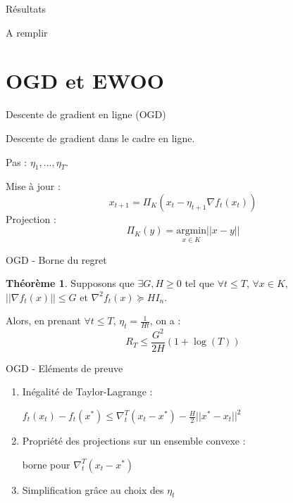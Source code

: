 \documentclass[aspectratio=1610,17pt,utf8]{beamer}
\theoremstyle{definition}
\newtheorem*{theo}{Théorème}
\begin{document}
\begin{frame}{Résultats}

A remplir

\end{frame}

\section{OGD et EWOO}

\begin{frame}{Descente de gradient en ligne (OGD)}

Descente de gradient dans le cadre \og en ligne\fg. 

Pas : $\eta_1, ..., \eta_T$.

Mise à jour :
\[
x_{t+1} = \Pi_K(x_t - \eta_{t+1} \nabla f_t (x_t))
\]
Projection :
\[
\Pi_K(y) = \underset{x \in K}{\text{argmin}} ||x-y||
\]
    
\end{frame}

\begin{frame}{OGD - Borne du regret}

\begin{theo}
Supposons que $\exists G, H \geq 0$ tel que $\forall t \leq T$, $\forall x \in K$, $||\nabla f_t(x)|| \leq G$ et $\nabla^2f_t(x) \succeq HI_n$.

Alors, en prenant $\forall t \leq T$, $\eta_t = \frac{1}{Ht}$, on a :
\[
R_T \leq \frac{G^2}{2H}(1 + \log(T))
\]
\end{theo} 

\end{frame}

\begin{frame}{OGD - Eléments de preuve}

\begin{enumerate}
    \item Inégalité de Taylor-Lagrange :
    
    $f_t(x_t) - f_t(x^*) \leq \nabla_t^T(x_t - x^*) - \frac{H}{2}||x^* - x_t||^2$
    \item Propriété des projections sur un ensemble convexe :
    
    borne pour $\nabla_t^T(x_t - x^*)$
    \item Simplification grâce au choix des $\eta_t$
\end{enumerate}

\end{frame}
\end{document}
